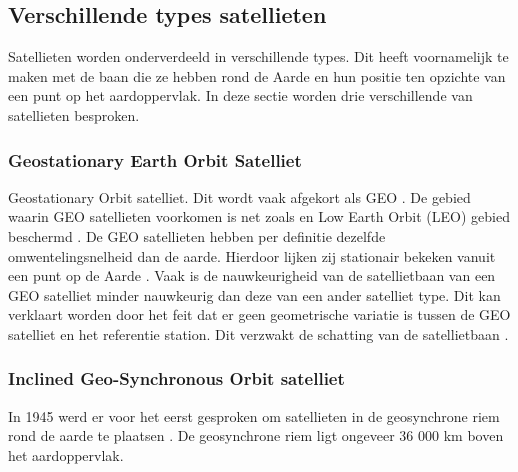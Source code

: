 \subsection{Verschillende types satellieten}
\label{LVTS}
Satellieten worden onderverdeeld in verschillende types. Dit heeft voornamelijk te maken met de baan die ze hebben rond de Aarde en hun positie ten opzichte van een punt op het aardoppervlak. In deze sectie worden drie verschillende van satellieten besproken. 

\subsubsection{Geostationary Earth Orbit Satelliet}
Geostationary Orbit satelliet. Dit wordt vaak afgekort als GEO \cite{LBibGEO,LBibMEO}. De gebied waarin GEO satellieten voorkomen is net zoals en Low Earth Orbit (LEO) gebied beschermd \cite{LBibMEO}. De GEO satellieten hebben per definitie dezelfde omwentelingsnelheid dan de aarde. Hierdoor lijken zij stationair bekeken vanuit een punt op de Aarde \cite{LBibGEO}.  Vaak is de nauwkeurigheid van de satellietbaan van een GEO satelliet minder nauwkeurig dan deze van een ander satelliet type. Dit kan verklaart worden door het feit dat er geen geometrische variatie is tussen de GEO satelliet en het referentie station. Dit verzwakt de schatting van de satellietbaan \cite{LBibPPP2}.

\subsubsection{Inclined Geo-Synchronous Orbit satelliet}
In 1945 werd er voor het eerst gesproken om satellieten in de geosynchrone riem rond de aarde te plaatsen \cite{LBibIGSO}. De geosynchrone riem ligt ongeveer 36 000 km boven het aardoppervlak. 
 
